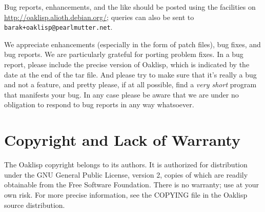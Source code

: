 Bug reports, enhancements, and the like should be posted using the
facilities on \url{http://oaklisp.alioth.debian.org/}; queries can
also be sent to \texttt{barak+oaklisp@pearlmutter.net}.

We appreciate enhancements (especially in the form of patch files),
bug fixes, and bug reports.  We are particularly grateful for porting
problem fixes.  In a bug report, please include the precise version of
Oaklisp, which is indicated by the date at the end of the tar file.
And please try to make sure that it's really a bug and not a feature,
and pretty please, if at all possible, find a \emph{very short} program
that manifests your bug.  In any case please be aware that we are
under no obligation to respond to bug reports in any way whatsoever.

\section{Copyright and Lack of Warranty}

The Oaklisp copyright belongs to its authors.  It is authorized for
distribution under the GNU General Public License, version 2, copies
of which are readily obtainable from the Free Software Foundation.
There is no warranty; use at your own risk.  For more precise
information, see the COPYING file in the Oaklisp source distribution.
